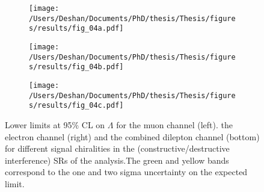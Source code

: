 \begin{figure}[!htpb]
    \centering
    \begin{subfigure}[b]{0.49\textwidth}
        \centering
        \texttt{[image: /Users/Deshan/Documents/PhD/thesis/Thesis/figures/results/fig\_04a.pdf]}
        \label{fig:limit_lambda1}
    \end{subfigure}
    \begin{subfigure}[b]{0.49\textwidth}
        \centering
        \texttt{[image: /Users/Deshan/Documents/PhD/thesis/Thesis/figures/results/fig\_04b.pdf]}
        \label{fig:limit_lambda2}
    \end{subfigure}
    \begin{subfigure}[b]{0.49\textwidth}
        \centering
        \texttt{[image: /Users/Deshan/Documents/PhD/thesis/Thesis/figures/results/fig\_04c.pdf]}
        \label{fig:limit_lambda3}
    \end{subfigure}
    \caption[Lower limits at 95$\%$ CL on $\Lambda$ for the muon channel, the electron channel and the combined dilepton channel for different signal chiralities in the (constructive/destructive interference) SRs of the analysis.]{
    Lower limits at 95$\%$ CL on $\Lambda$ for the muon channel (left). the electron channel (right) and the combined dilepton channel (bottom) for different signal chiralities in the (constructive/destructive interference) SRs of the analysis.The green and yellow bands correspond to the one and two sigma uncertainty on the expected limit.
    }
    \label{fig:limit_lambda}
    \end{figure}

